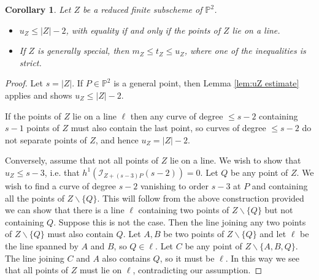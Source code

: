 \documentclass[12pt]{amsart}
\numberwithin{equation}{section}
\newtheorem{corollary}[theorem]{Corollary}
\theoremstyle{definition}
\begin{document}
\begin{corollary}\label{u_ZCor}
Let $Z$ be a reduced finite subscheme of ${ \ensuremath{\mathbb{P}}}^2$. 

\begin{itemize}

\item[(a)] $u_Z\leq |Z|-2$, with equality if and only if the points of $Z$ lie on a line.

\item[(b)] If $Z$ is generally special, then $m_Z\leq t_Z\leq u_Z$, where one of the inequalities is strict.
\end{itemize}
\end{corollary}

\begin{proof}
Let $s = |Z|$.
If $P \in { \ensuremath{\mathbb{P}}}^2$ is a general point, then Lemma \ref{lem:uZ estimate} applies and shows $u_Z \leq |Z|-2$.

If the points of $Z$ lie on a line $\ell$ then any curve of degree $\leq s-2$ containing $s-1$ points of $Z$ must also contain the last point, so curves of degree $\leq s-2$ do not separate points of $Z$, and hence $u_Z = |Z|-2$. 

Conversely, assume that not all points of $Z$ lie on a line. We wish to show that $u_Z \leq s-3$, i.e. that $h^1(\mathcal I_{Z + (s-3)P} (s-2)) = 0$. 
Let $Q$ be any point of $Z$. We wish to find a curve of degree $s-2$ vanishing to order $s-3$ at $P$ and containing all the points of $Z \backslash \{Q\}$. This will follow from the above construction provided we can show that there is a line $\ell$ containing two points of $Z \backslash \{Q\}$ but not containing $Q$. Suppose this is not the case. Then the line joining any two points of $Z \backslash \{Q\}$ must also contain $Q$. Let $A,B$ be two points of $Z \backslash \{Q\}$ and let $\ell$ be the line spanned by $A$ and $B$, so $Q \in \ell$. Let $C$ be any point of $Z \backslash \{A,B,Q \}$. The line joining $C$ and $A$ also contains $Q$, so it must be $\ell$. In this way we see that all points of $Z$ must lie on $\ell$, contradicting our assumption.


\end{proof}
\end{document}
